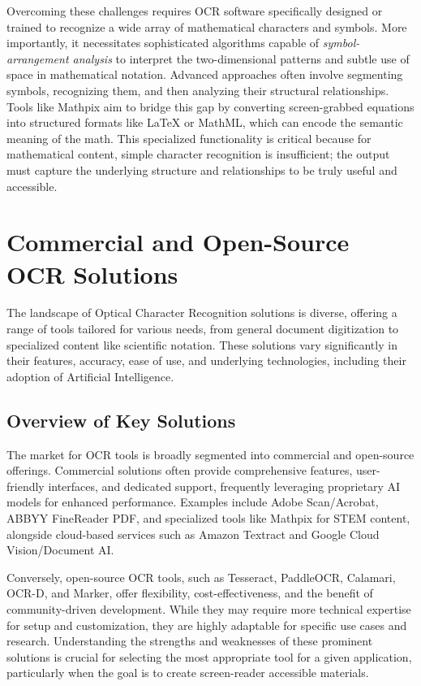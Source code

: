 Overcoming these challenges requires OCR software specifically designed or trained to recognize a wide array of mathematical characters and symbols. \cite{DocuclipperLimitations} More importantly, it necessitates sophisticated algorithms capable of \emph{symbol-arrangement analysis} to interpret the two-dimensional patterns and subtle use of space in mathematical notation. \cite{WorldScientificMathOCR} Advanced approaches often involve segmenting symbols, recognizing them, and then analyzing their structural relationships. \cite{ResearchGateMathSVM} Tools like Mathpix aim to bridge this gap by converting screen-grabbed equations into structured formats like LaTeX or MathML, which can encode the semantic meaning of the math. \cite{Mathpix} This specialized functionality is critical because for mathematical content, simple character recognition is insufficient; the output must capture the underlying structure and relationships to be truly useful and accessible.

\section{Commercial and Open-Source OCR Solutions}
\label{sec:ocr-solutions}

The landscape of Optical Character Recognition solutions is diverse, offering a range of tools tailored for various needs, from general document digitization to specialized content like scientific notation. These solutions vary significantly in their features, accuracy, ease of use, and underlying technologies, including their adoption of Artificial Intelligence.

\subsection{Overview of Key Solutions}

The market for OCR tools is broadly segmented into commercial and open-source offerings. Commercial solutions often provide comprehensive features, user-friendly interfaces, and dedicated support, frequently leveraging proprietary AI models for enhanced performance. Examples include Adobe Scan/Acrobat, ABBYY FineReader PDF, and specialized tools like Mathpix for STEM content, alongside cloud-based services such as Amazon Textract and Google Cloud Vision/Document AI.

Conversely, open-source OCR tools, such as Tesseract, PaddleOCR, Calamari, OCR-D, and Marker, offer flexibility, cost-effectiveness, and the benefit of community-driven development. While they may require more technical expertise for setup and customization, they are highly adaptable for specific use cases and research. \cite{Tesseract, PaddleOCR, Calamari, OCRD, Marker} Understanding the strengths and weaknesses of these prominent solutions is crucial for selecting the most appropriate tool for a given application, particularly when the goal is to create screen-reader accessible materials.

